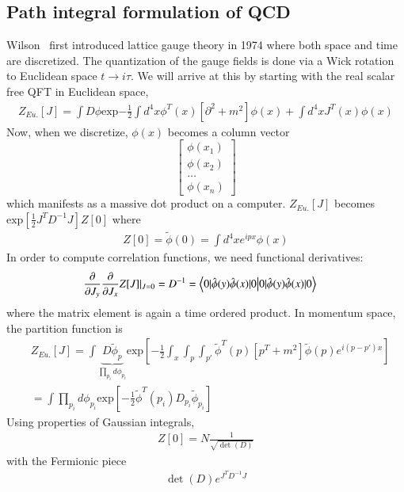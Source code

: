 \subsection{Path integral formulation of QCD}
Wilson~\cite{Wilson:1974sk} first introduced lattice gauge theory in 1974 where both space and time are discretized. The quantization of the gauge fields is done via a Wick rotation to Euclidean space $t\rightarrow i\tau$. We will arrive at this by starting with the real scalar free QFT in Euclidean space,
\begin{align}
    Z_{Eu.}[J] = \int D\phi \text{exp}{-\frac{1}{2} \int d^4x \phi^T(x)[\partial^2 +m^2] \phi(x) + \int d^4xJ^T(x)\phi(x)} 
\end{align}  
Now, when we discretize, $\phi(x)$ becomes a column vector 
$$\begin{bmatrix}
    \phi(x_1) \\
    \phi(x_2) \\
    \dots \\
    \phi(x_n)
\end{bmatrix} $$
which manifests as a massive dot product on a computer. 
$Z_{Eu.}[J]$ becomes $\text{exp}[\frac{1}{2}J^T D^{-1}J] Z[0]$ where
\begin{align}
    Z[0] = \tilde{\phi}(0) = \int d^4x e^{ipx} \phi(x)
\end{align}
In order to compute correlation functions, we need functional derivatives: 
\begin{align}
    \frac{\partial}{\partial J_y} \frac{\partial}{\partial J_x} Z[J] \rvert_{J=0} = D^{-1} 
    &= \braket{0|{\hat{\phi}(y)\hat{\phi}(x)}|0}
\end{align}
where the matrix element is again a time ordered product. In momentum space, the partition function is 
\begin{eqnarray}
    & Z_{Eu.}[J] = \int \underbrace{D\tilde{\phi}_p}_{\prod_{p_i} d\phi_{p_i}} \text{exp}[-\frac{1}{2} \int_x \int_p \int_{p'} \tilde{\phi}^T(p)[p^T +m^2] \tilde{\phi}(p) e^{i(p-p')x}] \\ 
    &= \int \prod_{p_i} d\phi_{p_i} \text{exp}[-\frac{1}{2}\tilde{\phi}^T(p_i)D_{p_i}\tilde{\phi}_{p_i}]
\end{eqnarray}
Using properties of Gaussian integrals, 
\begin{align}
    Z[0] = N \frac{1}{\sqrt{\det(D)}}
\end{align}
with the Fermionic piece 
\begin{align}
    \det(D) e^{J^TD^{-1}J}
\end{align}

